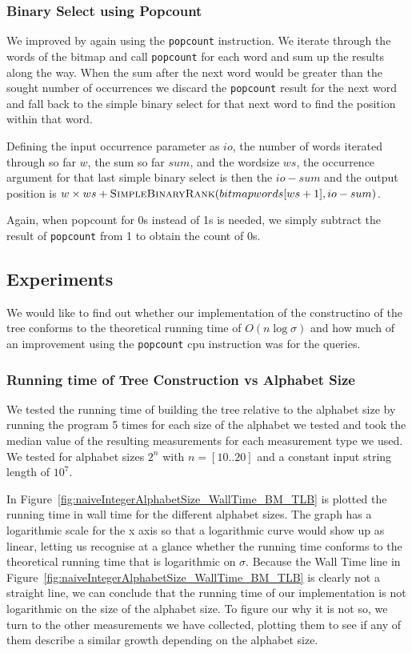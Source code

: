 \subsubsection{Binary Select using Popcount}
\label{sec:ImplBinarySelect}
We improved  by again using the \texttt{popcount} instruction. 
We iterate through the words of the bitmap and call \texttt{popcount} for each word and sum up the results along the way. 
When the sum after the next word would be greater than the sought number of occurrences we discard the \texttt{popcount} result for the next word and fall back to the simple binary select for that next word to find the position within that word.

Defining the input occurrence parameter as $io$, the number of words iterated through so far $w$, the sum so far $sum$, and the wordsize $ws$, the occurrence argument for that last simple binary select is then the $io - sum$ and the output position is $w \times ws + \textproc{SimpleBinaryRank}(bitmapwords[ws+1], io - sum)$.

Again, when popcount for 0s instead of 1s is needed, we simply subtract the result of \texttt{popcount} from 1 to obtain the count of 0s.

\subsection{Experiments}
We would like to find out whether our implementation of the constructino of the tree conforms to the theoretical running time of $O(n \log \sigma)$ and how much of an improvement using the \texttt{popcount} cpu instruction was for the queries.


\subsubsection{Running time of Tree Construction vs Alphabet Size}
We tested the running time of building the tree relative to the alphabet size by running the program 5 times for each size of the alphabet we tested and took the median value of the resulting measurements for each measurement type we used.
We tested for alphabet sizes $2^n$ with $n = [10..20]$ and a constant input string length of $10^7$.

In Figure~\ref{fig:naiveIntegerAlphabetSize_WallTime_BM_TLB} is plotted the running time in wall time for the different alphabet sizes. The graph has a logarithmic scale for the x axis so that a logarithmic curve would show up as linear, letting us recognise at a glance whether the running time conforms to the theoretical running time that is logarithmic on $\sigma$.
Because the Wall Time line in Figure~\ref{fig:naiveIntegerAlphabetSize_WallTime_BM_TLB} is clearly not a straight line, we can conclude that the running time of our implementation is not logarithmic on the size of the alphabet size.
To figure our why it is not so, we turn to the other measurements we have collected, plotting them to see if any of them describe a similar growth depending on the alphabet size.

